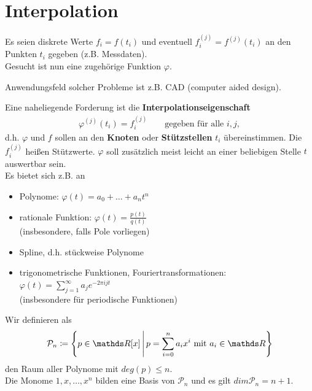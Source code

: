 % 
% 
% 
% 


\chapter{Interpolation}

Es seien diskrete Werte $f_i=f(t_i)$ und 
eventuell $f_i^{(j)} = f^{(j)}(t_i)$ 
an den Punkten $t_i$ gegeben (z.B. Messdaten).\\
Gesucht ist nun eine zugehörige Funktion $\varphi$.

Anwendungsfeld solcher Probleme ist z.B. CAD (computer aided
design).

Eine naheliegende Forderung ist die
\textbf{Interpolationseigenschaft}
\begin{gather*}
  \varphi^{(j)} (t_i) = f_i^{(j)}\qquad \text{gegeben für alle } i,j ,
\end{gather*}
d.h. $\varphi$ und $f$ sollen an den \textbf{Knoten} oder 
\textbf{Stützstellen} $t_i$ übereinstimmen.
Die $f_i^{(j)}$ heißen Stützwerte.
\label{im6.1}
$\varphi$ soll zusätzlich meist leicht an einer beliebigen Stelle $t$
auswertbar sein. \\
Es bietet sich z.B. an 
\begin{itemize}
\item Polynome: $\varphi(t) = a_0+\dots +a_n t^n$
\item rationale Funktion: $\varphi(t) = \frac{p(t)}{q(t)} $\\
  (insbesondere, falls Pole vorliegen)
\item Spline, d.h. stückweise Polynome
\item trigonometrische Funktionen, Fouriertransformationen:\\
  $ \varphi (t) = \sum_{j=1}^{\infty} a_je^{-2\pi ijt}$\\
  (insbesondere für periodische Funktionen)
\end{itemize}

Wir definieren als 
\begin{gather}
  \mathcal{P}_n \coloneqq \left\{ p \in \R[x]\,\middle\vert\,
    p= \sum_{i=0}^{n} a_ix^i \text{ mit } a_i\in\R \right\}
  \label{VI.1.1}
\end{gather}
den Raum aller Polynome mit $deg(p)\leq n$.\\
Die Monome $1,x, \dots , x^n$ bilden eine Basis von $\mathcal{P}_n$
und es gilt $dim\mathcal{P}_n = n+1$.

